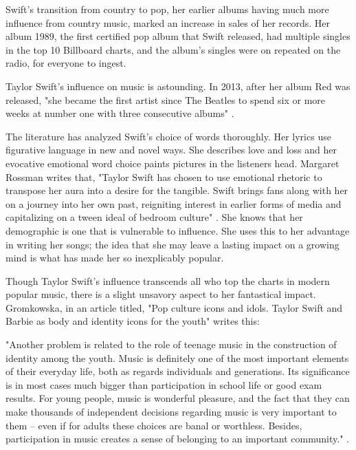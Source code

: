 \documentclass[12pt]{article}
\begin{document}
  Swift's transition from country to pop, her earlier albums having much more influence from country music, marked an increase in sales of her records. Her album 1989, the first certified pop album that Swift released, had multiple singles in the top 10 Billboard charts, and the album's singles were on repeated on the radio, for everyone to ingest. 
  
  Taylor Swift's influence on music is astounding. In 2013, after her album Red was released, "she became the first artist since The Beatles to spend
  six or more weeks at number one with three consecutive albums" \citep{newkey2014taylor}.
  
The literature has analyzed Swift's choice of words thoroughly. Her lyrics use figurative language in new and novel ways. She describes love and loss and her evocative emotional word choice paints pictures in the listeners head. Margaret Rossman writes that, "Taylor Swift has chosen to use emotional rhetoric to transpose her aura into a desire for the tangible. Swift brings fans along with her on a journey into her own past, reigniting interest in earlier forms of media and capitalizing on a tween ideal of bedroom culture" \citep{rossman2022taylor}. She knows that her demographic is one that is vulnerable to influence. She uses this to her advantage in writing her songs; the idea that she may leave a lasting impact on a growing mind is what has made her so inexplicably popular.

Though Taylor Swift's influence transcends all who top the charts in modern popular music, there is a slight unsavory aspect to her fantastical impact. Gromkowska, in an article titled, "Pop culture icons and idols. Taylor Swift and Barbie as body and identity icons for the youth" writes this:

"Another problem is related to the role of teenage music in the construction of identity among
the youth. Music is definitely one of the most important elements of their everyday life, both
as regards individuals and generations. Its significance is in most cases much bigger than
participation in school life or good exam results. For young people, music is wonderful pleasure, and the fact that they can make thousands of independent decisions regarding music
is very important to them – even if for adults these choices are banal or worthless. Besides,
participation in music creates a sense of belonging to an important community." \citep{gromkowskapop}.
\end{document}
